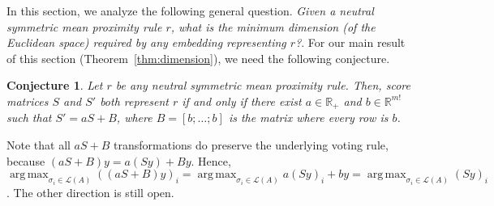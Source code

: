 \documentclass[10pt,letterpaper]{article}
\newcommand{\calL}{{\mathcal{L}}}
\newcommand{\rank}{{\calL(A)}}
\DeclareMathOperator*{\argmax}{arg\,max}
\newtheorem{conjecture}{Conjecture}
\begin{document}
In this section, we analyze the following general question. \emph{Given a neutral symmetric mean proximity rule $r$, what is the minimum dimension (of the Euclidean space) required by any embedding representing $r$?}. For our main result of this section (Theorem~\ref{thm:dimension}), we need the following conjecture.
\begin{conjecture}
Let $r$ be any neutral symmetric mean proximity rule. Then, score matrices $S$ and $S'$ both represent $r$ if and only if there exist $a \in \mathbb{R}_{+}$ and $b \in \mathbb{R}^{m!}$ such that $S' = aS+B$, where $B = [b;\ldots;b]$ is the matrix where every row is $b$. 
\label{conj:equivalent-score-matrix}
\end{conjecture}
Note that all $aS+B$ transformations do preserve the underlying voting rule, because $(aS+B)y = a(Sy)+By$. Hence, $\argmax_{\sigma_i \in \rank} ((aS+B)y)_i = \argmax_{\sigma_i \in \rank} a(Sy)_i + by = \argmax_{\sigma_i \in \rank} (Sy)_i$. The other direction is still open.
\end{document}
